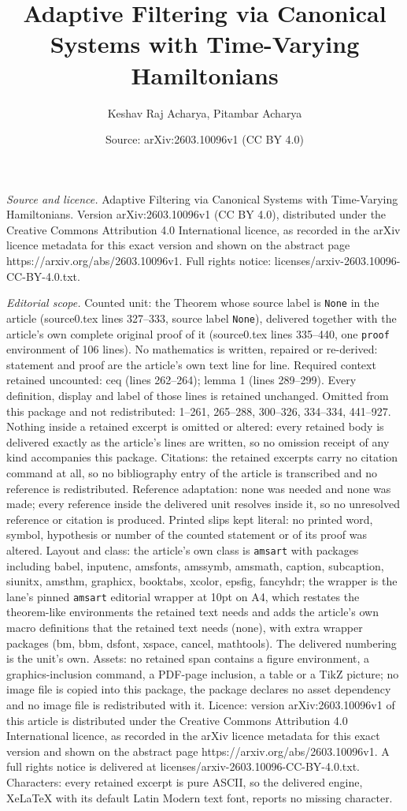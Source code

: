 \documentclass[10pt,a4paper]{amsart}
\title[Adaptive Filtering via Canonical Systems with Time-Varying H]{Adaptive Filtering via Canonical Systems with Time-Varying Hamiltonians}
\author{Keshav Raj Acharya, Pitambar Acharya}
\date{Source: arXiv:2603.10096v1 (CC BY 4.0)}
\begin{document}
\maketitle

\noindent\emph{Source and licence.} Adaptive Filtering via Canonical Systems with Time-Varying Hamiltonians. Version arXiv:2603.10096v1 (CC BY 4.0), distributed under the Creative Commons Attribution 4.0 International licence, as recorded in the arXiv licence metadata for this exact version and shown on the abstract page https://arxiv.org/abs/2603.10096v1. Full rights notice: licenses/arxiv-2603.10096-CC-BY-4.0.txt.\par\smallskip

\noindent\textit{Editorial scope.} Counted unit: the Theorem whose source label is \texttt{None} in the article (source0.tex lines 327--333, source label \texttt{None}), delivered together with the article's own complete original proof of it (source0.tex lines 335--440, one \texttt{proof} environment of 106 lines). No mathematics is written, repaired or re-derived: statement and proof are the article's own text line for line. Required context retained uncounted: ceq (lines 262--264); lemma 1 (lines 289--299). Every definition, display and label of those lines is retained unchanged. Omitted from this package and not redistributed: 1--261, 265--288, 300--326, 334--334, 441--927. Nothing inside a retained excerpt is omitted or altered: every retained body is delivered exactly as the article's lines are written, so no omission receipt of any kind accompanies this package. Citations: the retained excerpts carry no citation command at all, so no bibliography entry of the article is transcribed and no reference is redistributed. Reference adaptation: none was needed and none was made; every reference inside the delivered unit resolves inside it, so no unresolved reference or citation is produced. Printed slips kept literal: no printed word, symbol, hypothesis or number of the counted statement or of its proof was altered. Layout and class: the article's own class is \texttt{amsart} with packages including babel, inputenc, amsfonts, amssymb, amsmath, caption, subcaption, siunitx, amsthm, graphicx, booktabs, xcolor, epsfig, fancyhdr; the wrapper is the lane's pinned \texttt{amsart} editorial wrapper at 10pt on A4, which restates the theorem-like environments the retained text needs and adds the article's own macro definitions that the retained text needs (none), with extra wrapper packages (bm, bbm, dsfont, xspace, cancel, mathtools). The delivered numbering is the unit's own. Assets: no retained span contains a figure environment, a graphics-inclusion command, a PDF-page inclusion, a table or a TikZ picture; no image file is copied into this package, the package declares no asset dependency and no image file is redistributed with it. Licence: version arXiv:2603.10096v1 of this article is distributed under the Creative Commons Attribution 4.0 International licence, as recorded in the arXiv licence metadata for this exact version and shown on the abstract page https://arxiv.org/abs/2603.10096v1. A full rights notice is delivered at licenses/arxiv-2603.10096-CC-BY-4.0.txt. Characters: every retained excerpt is pure ASCII, so the delivered engine, XeLaTeX with its default Latin Modern text font, reports no missing character.
\end{document}
